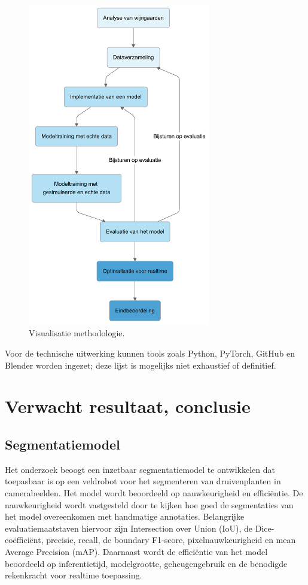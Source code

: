 \begin{figure}[h]
    \includegraphics[width=8cm]{img/verloop.png}
    \caption{Visualisatie methodologie.}
    \label{fig:met}
\end{figure}

Voor de technische uitwerking kunnen tools zoals Python, PyTorch, GitHub en Blender worden ingezet; deze lijst is mogelijks niet exhaustief of definitief.

\section{Verwacht resultaat, conclusie}%
\label{sec:verwachte_resultaten}

\subsection{Segmentatiemodel}
Het onderzoek beoogt een inzetbaar segmentatiemodel te ontwikkelen dat toepasbaar is op een veldrobot voor het segmenteren van druivenplanten in camerabeelden. Het model wordt beoordeeld op nauwkeurigheid en efficiëntie. De nauwkeurigheid wordt vastgesteld door te kijken hoe goed de segmentaties van het model overeenkomen met handmatige annotaties. Belangrijke evaluatiemaatstaven hiervoor zijn Intersection over Union (IoU), de Dice-coëfficiënt, precisie, recall, de boundary F1-score, pixelnauwkeurigheid en mean Average Precision (mAP). Daarnaast wordt de efficiëntie van het model beoordeeld op inferentietijd, modelgrootte, geheugengebruik en de benodigde rekenkracht voor realtime toepassing.

